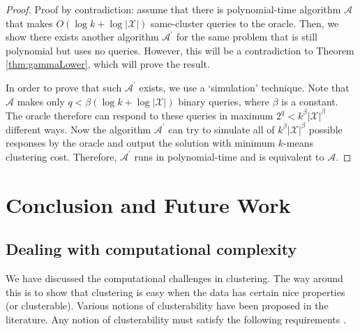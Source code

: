 \documentclass[letterpaper,12pt,titlepage,oneside,final]{book}
\newcommand{\mc}{\mathcal}
\begin{document}
\begin{proof}
Proof by contradiction: assume that there is polynomial-time algorithm $\mc A$ that makes $O(\log k + \log |\mc X|)$ same-cluster queries to the oracle. Then, we show there exists another algorithm $\mc A^\prime$ for the same problem that is still polynomial but uses no queries. However, this will be a contradiction to Theorem \ref{thm:gammaLower}, which will prove the result.

In order to prove that such $\mc A^\prime$ exists, we use a `simulation' technique. Note that $\mc A$ makes only $q<\beta(\log k + \log |\mc X|)$ binary queries, where $\beta$ is a constant. The oracle therefore can respond to these queries in maximum $2^{q} < k^\beta|\mc X|^\beta$ different ways. Now the algorithm $\mc A^\prime$ can try to simulate all of $k^\beta|\mc X|^\beta$ possible responses by the oracle and output the solution with minimum $k$-means clustering cost. Therefore, $\mc A^\prime$ runs in polynomial-time and is equivalent to $\mc A$.
\end{proof}










\chapter{Conclusion and Future Work}
\label{FUTURE}
\section{Dealing with computational complexity}
We have discussed the computational challenges in clustering. The way around this is to show that clustering is easy when the data has certain nice properties (or clusterable). Various notions of clusterability have been proposed in the literature. Any notion of clusterability must satisfy the following requirements \cite{ben2015computational}. 
\end{document}
